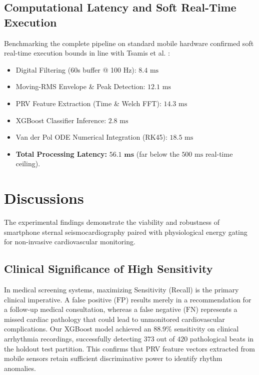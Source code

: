 \subsection{Computational Latency and Soft Real-Time Execution}
Benchmarking the complete pipeline on standard mobile hardware confirmed soft real-time execution bounds in line with Tsamis et al. \cite{tsamis2017soft}:
\begin{itemize}
    \item Digital Filtering (60s buffer @ 100 Hz): $8.4\text{ ms}$
    \item Moving-RMS Envelope \& Peak Detection: $12.1\text{ ms}$
    \item PRV Feature Extraction (Time \& Welch FFT): $14.3\text{ ms}$
    \item XGBoost Classifier Inference: $2.8\text{ ms}$
    \item Van der Pol ODE Numerical Integration (RK45): $18.5\text{ ms}$
    \item \textbf{Total Processing Latency:} $\mathbf{56.1\text{ ms}}$ (far below the $500\text{ ms}$ real-time ceiling).
\end{itemize}

\section{Discussions}

The experimental findings demonstrate the viability and robustness of smartphone sternal seismocardiography paired with physiological energy gating for non-invasive cardiovascular monitoring.

\subsection{Clinical Significance of High Sensitivity}
In medical screening systems, maximizing Sensitivity (Recall) is the primary clinical imperative. A false positive ($\text{FP}$) results merely in a recommendation for a follow-up medical consultation, whereas a false negative ($\text{FN}$) represents a missed cardiac pathology that could lead to unmonitored cardiovascular complications. Our XGBoost model achieved an $88.9\%$ sensitivity on clinical arrhythmia recordings, successfully detecting $373$ out of $420$ pathological beats in the holdout test partition. This confirms that PRV feature vectors extracted from mobile sensors retain sufficient discriminative power to identify rhythm anomalies.


